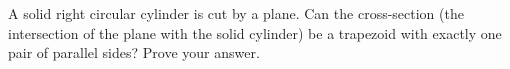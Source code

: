 A solid right circular cylinder is cut by a plane. Can the cross-section (the intersection of the plane with the solid cylinder) be a trapezoid with exactly one pair of parallel sides? Prove your answer.
